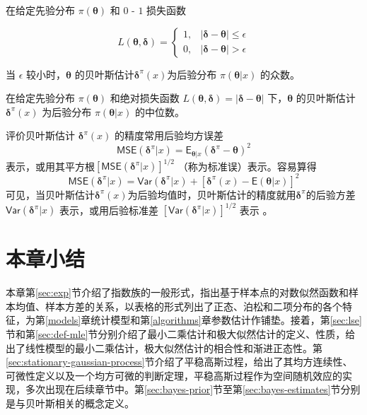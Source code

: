 \documentclass[12pt,a4paper,UTF8,twoside]{book}
\theoremstyle{definition}
\theoremstyle{definition}
\theoremstyle{definition}
\theoremstyle{remark}
\let\BeginKnitrBlock\begin \let\EndKnitrBlock\end
\begin{document}
\BeginKnitrBlock{theorem}[0 - 1 损失]
\protect\hypertarget{thm:bayes-estimate-01}{}{\label{thm:bayes-estimate-01} \iffalse (0 - 1 损失) \fi{} }在给定先验分布 \(\pi(\boldsymbol{\theta})\) 和 \(0\) - \(1\) 损失函数

\begin{equation*}
L(\boldsymbol{\theta},\boldsymbol{\delta}) = 
\begin{cases}
1, & | \boldsymbol{\delta} - \boldsymbol{\theta}| \leq \epsilon \\
0, & | \boldsymbol{\delta} - \boldsymbol{\theta}| > \epsilon
\end{cases}
\end{equation*}

当 \(\epsilon\) 较小时，\(\boldsymbol{\theta}\) 的贝叶斯估计\(\boldsymbol{\delta}^{\pi}(x)\)为后验分布 \(\pi(\boldsymbol{\theta}|x)\) 的众数\citep{mao2006}。
\EndKnitrBlock{theorem}

\BeginKnitrBlock{theorem}[绝对值损失]
\protect\hypertarget{thm:bayes-estimate-abs}{}{\label{thm:bayes-estimate-abs} \iffalse (绝对值损失) \fi{} }在给定先验分布 \(\pi(\boldsymbol{\theta})\) 和绝对损失函数 \(L(\boldsymbol{\theta},\boldsymbol{\delta}) = |\boldsymbol{\delta} - \boldsymbol{\theta}|\) 下，\(\boldsymbol{\theta}\) 的贝叶斯估计 \(\boldsymbol{\delta}^{\pi}(x)\) 为后验分布 \(\pi(\boldsymbol{\theta}|x)\) 的中位数\citep{mao2006}。
\EndKnitrBlock{theorem}

评价贝叶斯估计 \(\boldsymbol{\delta}^{\pi}(x)\) 的精度常用后验均方误差
\[\mathsf{MSE}(\boldsymbol{\delta}^{\pi}|x) = \mathsf{E}_{\boldsymbol{\theta}|x}(\boldsymbol{\delta}^{\pi} - \boldsymbol{\theta})^2\]
表示，或用其平方根\([\mathsf{MSE}(\boldsymbol{\delta}^{\pi}|x)]^{1/2}\) （称为标准误）表示。容易算得
\[\mathsf{MSE}(\boldsymbol{\delta}^{\pi}|x) = \mathsf{Var}(\boldsymbol{\delta}^{\pi}|x) + [\boldsymbol{\delta}^{\pi}(x) - \mathsf{E}(\boldsymbol{\theta}|x)]^2\]
可见，当贝叶斯估计\(\boldsymbol{\delta}^{\pi}(x)\)为后验均值时，贝叶斯估计的精度就用\(\boldsymbol{\delta}^{\pi}\)的后验方差\(\mathsf{Var}(\boldsymbol{\delta}^{\pi}|x)\) 表示，或用后验标准差 \([\mathsf{Var}(\boldsymbol{\delta}^{\pi}|x)]^{1/2}\) 表示 \citep{mao2006}。

\hypertarget{sec:foundations}{%
\section{本章小结}\label{sec:foundations}}

本章第\ref{sec:exp}节介绍了指数族的一般形式，指出基于样本点的对数似然函数和样本均值、样本方差的关系，以表格的形式列出了正态、泊松和二项分布的各个特征，为第\ref{models}章统计模型和第\ref{algorithms}章参数估计作铺垫。接着，第\ref{sec:lse}节和第\ref{sec:def-mle}节分别介绍了最小二乘估计和极大似然估计的定义、性质，给出了线性模型的最小二乘估计，极大似然估计的相合性和渐进正态性。第\ref{sec:stationary-gaussian-process}节介绍了平稳高斯过程，给出了其均方连续性、可微性定义以及一个均方可微的判断定理，平稳高斯过程作为空间随机效应的实现，多次出现在后续章节中。第\ref{sec:bayes-prior}节至第\ref{sec:bayes-estimates}节分别是与贝叶斯相关的概念定义。
\end{document}
